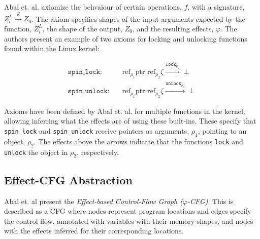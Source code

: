 Abal et. al. axiomize the behvaiour of certain operations, $f$, with a signature, $Z_{i}^{L} \stackrel{\varphi}{\rightarrow} Z_0$. The axiom specifies shapes of the input arguments expected by the function, $Z_{i}^{L}$, the shape of the output, $Z_0$, and the resulting effects, $\varphi$. The authors present an example of two axioms for locking and unlocking functions found within the Linux kernel: 

\begin{equation*}
\begin{aligned}
        \texttt{spin\_lock}: \quad & \text{ref}_{\rho_1} \text{ptr } \text{ref}_{\rho_2} \zeta \xrightarrow{{\texttt{lock}}_{\rho_2}}\perp \\
        \texttt{spin\_unlock}: \quad & \text{ref}_{\rho_1} \text{ptr } \text{ref}_{\rho_2} \zeta \xrightarrow{{\texttt{unlock}}_{\rho_2}}\perp
\end{aligned}
\end{equation*}

\noindent Axioms have been defined by Abal et. al. for multiple functions in the kernel, allowing inferring what the effects are of using these built-ins. These specify that \texttt{spin\_lock} and \texttt{spin\_unlock} receive pointers as arguments, $\rho_1$, pointing to an object, $\rho_2$. The effects above the arrows indicate that the functions \texttt{lock} and \texttt{unlock} the object in $\rho_2$, respectively.

\subsection{Effect-CFG Abstraction}
Abal et. al present the \textit{Effect-based Control-Flow Graph ($\varphi$-CFG)}. This is described as a CFG where nodes represent program locations and edges specify the control flow, annotated with variables with their memory shapes, and nodes with the effects inferred for their corresponding locations. 
